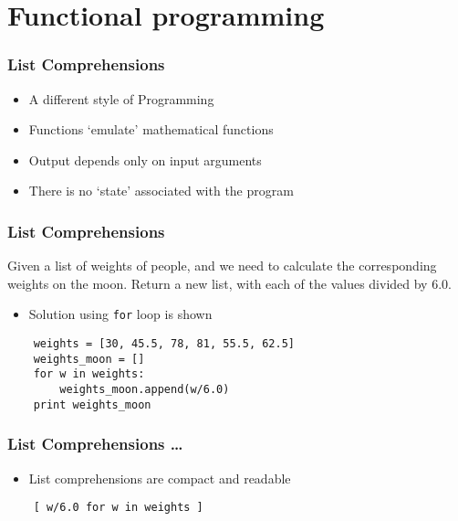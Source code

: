\section{Functional programming}

\begin{frame}[fragile]
  \frametitle{List Comprehensions}
  \begin{itemize}
  \item A different style of Programming
  \item Functions `emulate' mathematical functions
  \item Output depends only on input arguments
  \item There is no `state' associated with the program
  \end{itemize}
\end{frame}

\begin{frame}[fragile]
  \frametitle{List Comprehensions}
  \begin{block}{}
    Given a list of weights of people, and we need to
    calculate the corresponding weights on the moon. Return a new
    list, with each of the values divided by 6.0. 
  \end{block}

  \begin{itemize}
  \item Solution using \texttt{for} loop is shown
  \end{itemize}
  \begin{lstlisting}
    weights = [30, 45.5, 78, 81, 55.5, 62.5]
    weights_moon = []
    for w in weights:
        weights_moon.append(w/6.0)
    print weights_moon
  \end{lstlisting}
\end{frame}

\begin{frame}[fragile]
  \frametitle{List Comprehensions \ldots}
  \begin{itemize}
  \item List comprehensions are compact and readable
  \end{itemize}
  \begin{lstlisting}
    [ w/6.0 for w in weights ]
  \end{lstlisting}
\end{frame}

